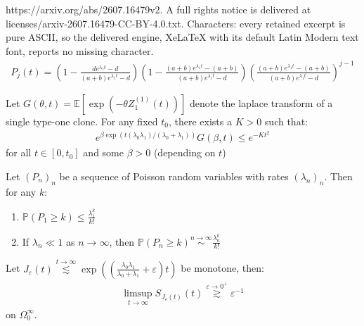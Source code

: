 \documentclass[10pt,a4paper]{amsart}
\newcommand{\gsimas}[2]{\overset{{#1}\to {#2}}{\gtrsim}}
\newcommand{\lsimas}[2]{\overset{{#1}\to {#2}}{\lesssim}}
\begin{document}
https://arxiv.org/abs/2607.16479v2. A full rights notice is delivered at licenses/arxiv-2607.16479-CC-BY-4.0.txt. Characters: every retained excerpt is pure ASCII, so the delivered engine, XeLaTeX with its default Latin Modern text font, reports no missing character.
\begin{align}
    P_j(t)=\left(1-\frac{de^{\lambda_1 t}-d}{(a+b)e^{\lambda_1 t}-d}\right)\left(1-\frac{(a+b)e^{\lambda_1 t}-(a+b)}{(a+b)e^{\lambda_1 t}-d}\right)\left(\frac{(a+b)e^{\lambda_1 t}-(a+b)}{(a+b)e^{\lambda_1 t}-d}\right)^{j-1}\label{eq:P_j}
\end{align}

\begin{lemma}\label{lem:MGF_bound}
  Let $G(\theta,t)=\mathbb{E}[\exp(-\theta Z_1^{(1)}(t))]$ denote the laplace transform of a single type-one clone. For any fixed $t_0$, there exists a $K>0$ such that:
  \begin{align*}
    e^{\beta \exp(t(\lambda_0\lambda_1)/(\lambda_0+\lambda_1))}G(\beta,t)\leq e^{-Kt^2}
  \end{align*}
  for all $t\in [0,t_0]$ and some $\beta>0$ (depending on $t$)
\end{lemma}

\begin{lemma}\label{lem:poisson_tails}
  Let $(P_n)_n$ be a sequence of Poisson random variables with rates $(\lambda_n)_n$. Then for any $k$:
  \begin{enumerate}
    \item $\mathbb{P}(P_1\geq k)\leq \frac{\lambda_1^k}{k!}$
    \item If $\lambda_n\ll 1$ as $n\to\infty$, then $\mathbb{P}(P_n\geq k)\overset{n\to\infty}{\sim} \frac{\lambda_n^k}{k!}$
  \end{enumerate}
\end{lemma}

\begin{proposition}\label{prop:limsup_theta}
   Let $J_\varepsilon(t)\lsimas{t}{\infty}\exp\left(\left(\frac{\lambda_0\lambda_1}{\lambda_0+\lambda_1}+\varepsilon\right)t\right)$ be monotone, then:
    \begin{align*}
        \limsup_{t\to\infty} S_{J_\varepsilon(t)}(t)\gsimas{\varepsilon}{0^+}\varepsilon^{-1}
    \end{align*}
    on $\Omega_0^\infty$.
\end{proposition}
\end{document}
